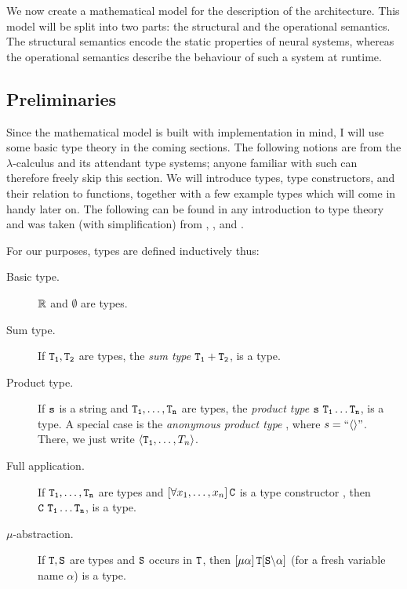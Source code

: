 We now create a mathematical model for the description of the architecture. This model will be split into two parts: the structural and the operational semantics. The structural semantics encode the static properties of neural systems, whereas the operational semantics describe the behaviour of such a system at runtime.

\subsection{Preliminaries}\label{sec:mathematicalPreliminaries}

Since the mathematical model is built with implementation in mind, I will use some basic type theory in the coming sections. The following notions are from the $\lambda$-calculus and its attendant type systems; anyone familiar with such can therefore freely skip this section. We will introduce types, type constructors, and their relation to functions, together with a few example types which will come in handy later on. The following can be found in any introduction to type theory and was taken (with simplification) from \cite{Mendler:1988:IDT:913822}, \cite{typeIntroduction2}, and \cite{Jacobs97atutorial}.

\begin{definition}\label{def:type}
For our purposes, types are defined inductively thus:
	\begin{description}
		\item[Basic type.] $\mathbb{R}$ and $\emptyset$ are types.
		\item[Sum type.] If $\mathtt{T_1},\mathtt{T_2}$ are types, the {\em sum type} $\mathtt{T_1 + T_2}$, is a type. 
		\item[Product type.] If $\mathtt{s}$ is a string and $\mathtt{T_1},\dots,\mathtt{T_n}$ are types, the {\em product type} $\type{s}\ \type{T_1} \dots \type{T_n}$, is a type. A special case is the {\em anonymous product type} , where $s=``\langle\rangle"$. There, we just write $\langle\mathtt{T_1},\dots,T_n \rangle$.
		\item[Full application.] If $\mathtt{T_1},\dots,\mathtt{T_n}$ are types and $\left[\forall x_1,\dots,x_n \right] \mathtt{C}$ is a type constructor , then $\mathtt{C\ T_1} \dots \mathtt{T_n}$, is a type.
		\item[$\mu$-abstraction.] If $\mathtt{T}, \mathtt{S}$ are types and $\mathtt{S}$ occurs in $\mathtt{T}$, then $\left[\mu \alpha \right]\mathtt{T}[\mathtt{S}\backslash\alpha]$ (for a fresh variable name $\alpha$) is a type.
	\end{description}
\end{definition}

